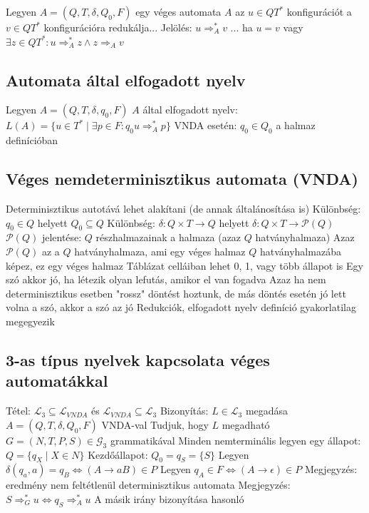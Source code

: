 \documentclass[12pt,a4paper]{article}
\newcommand{\gtos}{\Rightarrow_G^*}
\newcommand{\ato}{\Rightarrow_A}
\newcommand{\atos}{\Rightarrow_A^*}
\begin{document}
\begin{outline}
	\1 Legyen $A=(Q,T,\delta,Q_0,F)$ egy véges automata
	\1 $A$ az $u \in QT^*$ konfigurációt a $v \in QT^*$ konfigurációra redukálja...
		\2 Jelölés: $u \atos v$
	\1 ... ha $u = v$ vagy $\exists z \in QT^*: u \atos z \wedge z \ato v$
\end{outline}

\subsection{Automata által elfogadott nyelv}

\begin{outline}
	\1 Legyen $A=(Q,T,\delta,q_0,F)$
	\1 $A$ által elfogadott nyelv: $L(A) = \{u \in T^* \;|\; \exists p \in F: q_0 u \atos p \}$
	\1 VNDA esetén: $q_0 \in Q_0$ a halmaz definícióban
\end{outline}

\pagebreak

\subsection{Véges nemdeterminisztikus automata (VNDA)}

\begin{outline}
	\1 Determinisztikus autotává lehet alakítani (de annak általánosítása is)
	\1 Különbség: $q_0 \in Q$ helyett $Q_0 \subseteq Q$
	\1 Különbség: $\delta : Q \times T \to Q$ helyett $\delta: Q \times T \to \mathcal{P}(Q)$
		\2 $\mathcal{P}(Q)$ jelentése: $Q$ részhalmazainak a halmaza (azaz $Q$ hatványhalmaza)
		\2 Azaz $\mathcal{P}(Q)$ az a $Q$ hatványhalmaza, ami egy véges halmaz
		\2 $Q$ hatványhalmazába képez, ez egy véges halmaz
		\2 Táblázat celláiban lehet 0, 1, vagy több állapot is
	\1 Egy szó akkor jó, ha létezik olyan lefutás, amikor el van fogadva
		\2 Azaz ha nem determinisztikus esetben "rossz" döntést hoztunk, de más döntés esetén jó lett volna a szó, akkor a szó az jó
	\1 Redukciók, elfogadott nyelv definíció gyakorlatilag megegyezik
\end{outline}

\subsection{3-as típus nyelvek kapcsolata véges automatákkal}

\begin{outline}
	\1 Tétel: $\mathcal{L}_3 \subseteq \mathcal{L}_{VNDA}$ és $\mathcal{L}_{VNDA} \subseteq \mathcal{L}_3$
	\1 Bizonyítás: $L \in \mathcal{L}_3$ megadása $A=(Q,T,\delta,Q_0,F)$ VNDA-val
		\2 Tudjuk, hogy $L$ megadható $G=(N,T,P,S) \in \mathcal{G}_3$ grammatikával
		\2 Minden nemterminális legyen egy állapot: $Q = \{q_X \;|\; X \in N\}$
		\2 Kezdőállapot: $Q_0 = q_S = \{S\}$
		\2 Legyen $\delta(q_a,a) = q_B \Leftrightarrow (A \to aB) \in P$
		\2 Legyen $q_A \in F \Leftrightarrow (A \to \epsilon) \in P$
		\2 Megjegyzés: eredmény nem feltétlenül determinisztikus automata
		\2 Megjegyzés: $S \gtos u \Leftrightarrow q_S \atos u$
	\1 A másik irány bizonyítása hasonló
\end{outline}
\end{document}
